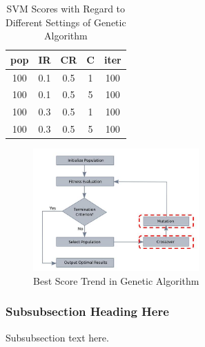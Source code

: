 \documentclass[journal]{IEEEtran}
\begin{document}
\begin{table}[htbp]
\centering
\caption{SVM Scores with Regard to Different Settings of Genetic Algorithm}
\label{tab:3}
\begin{tabular}{ccccc}
\toprule

pop&IR&CR&C&iter \\  %
\midrule

100&0.1&0.5&1&100 \\

100&0.1&0.5&5&100 \\

100&0.3&0.5&1&100 \\

100&0.3&0.5&5&100 \\
\bottomrule
\end{tabular}
\end{table}
\begin{figure}[htpb]
  \centering
  \includegraphics[width=2.5in]{genetic_alg.jpg}
  \caption{Best Score Trend in Genetic Algorithm}
  \label{fig:3}
  \vspace{-3mm}
\end{figure}

\subsubsection{Subsubsection Heading Here}
Subsubsection text here.


%
%
\end{document}
